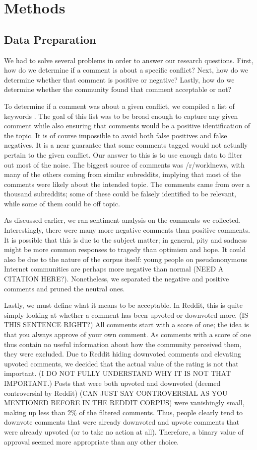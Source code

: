 \section{Methods}
\subsection{Data Preparation}
We had to solve several problems in order to answer our research questions. First, how do we determine if a comment is about a specific conflict? Next, how do we determine whether that comment is positive or negative? Lastly, how do we determine whether the community found that comment acceptable or not?

To determine if a comment was about a given conflict, we compiled a list of keywords . The goal of this list was to be broad enough to capture any given comment while also ensuring that comments would be a positive identification of the topic. It is of course impossible to avoid both false positives and false negatives. It is a near guarantee that some comments tagged would not actually pertain to the given conflict. Our answer to this is to use enough data to filter out most of the noise. The biggest source of comments was /r/worldnews, with many of the others coming from similar subreddits, implying that most of the comments were likely about the intended topic. The comments came from over a thousand subreddits; some of these could be falsely identified to be relevant, while some of them could be off topic. 

As discussed earlier, we ran sentiment analysis on the comments we collected. Interestingly, there were many more negative comments than positive comments. It is possible that this is due to the subject matter; in general, pity and sadness might be more common responses to tragedy than optimism and hope. It could also be due to the nature of the corpus itself: young people on pseudononymous Internet communities are perhaps more negative than normal (NEED A CITATION HERE?). Nonetheless, we separated the negative and positive comments and pruned the neutral ones.

Lastly, we must define what it means to be acceptable. In Reddit, this is quite simply looking at whether a comment has been upvoted or downvoted more. (IS THIS SENTENCE RIGHT?) All comments start with a score of one; the idea is that you always approve of your own comment. As comments with a score of one thus contain no useful information about how the community perceived them, they were excluded. Due to Reddit hiding downvoted comments and elevating upvoted comments, we decided that the actual value of the rating is not that important. (I DO NOT FULLY UNDERSTAND WHY IT IS NOT THAT IMPORTANT.) Posts that were both upvoted and downvoted (deemed controversial by Reddit) (CAN JUST SAY CONTROVERSIAL AS YOU MENTIONED BEFORE IN THE REDDIT CORPUS) were vanishingly small, making up less than 2\% of the filtered comments. Thus, people clearly tend to downvote comments that were already downvoted and upvote comments that were already upvoted (or to take no action at all). Therefore, a binary value of approval seemed more appropriate than any other choice.


